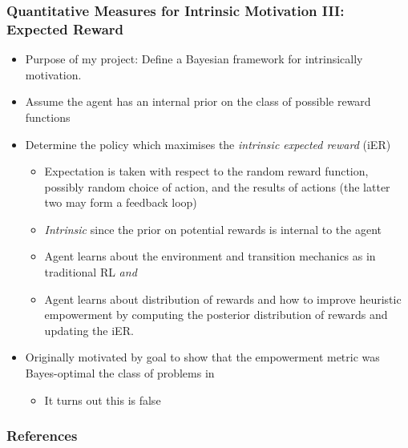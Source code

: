 \documentclass[aspectratio=169]{beamer}
\begin{document}
\begin{frame}
	\frametitle{Quantitative Measures for Intrinsic Motivation III: Expected Reward}
	\begin{itemize}
		\item Purpose of my project: Define a Bayesian framework for intrinsically motivation.
		\item Assume the agent has an internal prior on the class of possible reward functions\pause
		\item Determine the policy which maximises the \textit{intrinsic expected reward} (iER)
		\begin{itemize}
			\item Expectation is taken with respect to the random reward function, possibly random choice of action, and the results of actions (the latter two may form a feedback loop)\pause
			\item \textit{Intrinsic} since the prior on potential rewards is internal to the agent\pause\vspace{0.5em}
			\item Agent learns about the environment and transition mechanics as in traditional RL \textit{and} 
			\item Agent learns about distribution of rewards and how to improve heuristic empowerment by computing the posterior distribution of rewards and updating the iER.\pause			
		\end{itemize}		 
		\item Originally motivated by goal to show that the empowerment metric was Bayes-optimal the class of problems in \citet{mohamed2015variational}
		\begin{itemize}
			\item It turns out this is false
		\end{itemize}
	\end{itemize}
\end{frame}

\begin{frame}[allowframebreaks]
\frametitle{References}
\nocite{*}

\end{frame}
\end{document}
